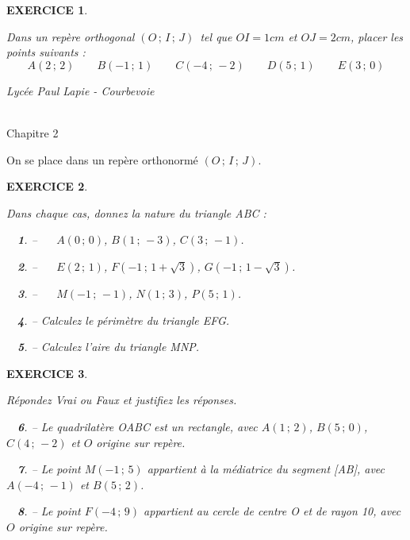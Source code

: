 \documentclass[a4paper]{article}   %
\renewcommand{\(}{\left(}
\renewcommand{\)}{\right)}
\newtheorem{ques}{~}
\newenvironment{qu}{\begin{ques}--} {\end{ques}}
\newtheorem{EXO}{\large EXERCICE }
\newenvironment{EX}   { \setcounter{ques}{0} \begin{EXO} \hrulefill ~\vspace{0.3cm}

\normalfont}    {\end{EXO} \medskip}
\newcommand{\rIJ}{$\left(O\,;\,I\,;\,J\right)$}
\def\cl{{\Large \bf{2nde}}}
\begin{document}
\begin{EX} \setcounter{ques}{0}
Dans un repère orthogonal \rIJ ~tel que $OI=1cm$ et $OJ=2cm$, placer les points suivants :
$$A(2\,;\,2) \qquad B(-1\,;\,1) \qquad C(-4\,;\,-2) \qquad D(5\,;\,1) \qquad E(3\,;\,0)$$
\end{EX}

\newpage \setcounter{ques}{0}
\noindent\begin{minipage}{.20\linewidth}\begin{center}                   %
\noindent \emph{Lycée Paul Lapie - Courbevoie}
\end{center}\end{minipage}
\begin{minipage}{1.5\linewidth}\begin{center}		%
\noindent \cl\\ Chapitre 2
\end{center}\end{minipage}

\begin{center} 		%
\end{center}

On se place dans un repère orthonormé \rIJ.

\begin{EX}
Dans chaque cas, donnez la nature du triangle ABC :
\begin{qu} ~~ $A(0\,;\,0)$, $B(1\,;\, -3)$, $C(3\,;\,-1)$.
\end{qu} \begin{qu} ~~ $E(2\,;\,1)$, $F(-1\,;\,1+\sqrt 3)$, $G( -1\,;\, 1-\sqrt 3)$.
\end{qu} \begin{qu} ~~ $M(-1 \,;\,-1)$, $N(1\,;\,3 )$, $P(5\,;\, 1)$. 
\end{qu}
\begin{qu} Calculez le périmètre du triangle EFG.
\end{qu}
\begin{qu} Calculez l'aire du triangle MNP.
\end{qu}

\end{EX}

\begin{EX}
Répondez Vrai ou Faux et justifiez les réponses.
\setcounter{ques}{0}
\begin{qu}
 Le quadrilatère OABC est un rectangle, avec $A(1\,;\,2)$, $B(5\,;\,0)$, $C(4\,;\,-2)$ et $O$ origine sur repère.
\end{qu} \begin{qu} Le point $M(-1\,;\,5)$ appartient à la médiatrice du segment [AB], avec $A(-4 \,;\,-1)$ et $B(5\,;\,2)$.
\end{qu} \begin{qu} Le point $F(-4\,;\,9)$ appartient au cercle de centre O et de rayon 10, avec $O$ origine sur repère.
\end{qu}
\end{EX}
\end{document}
